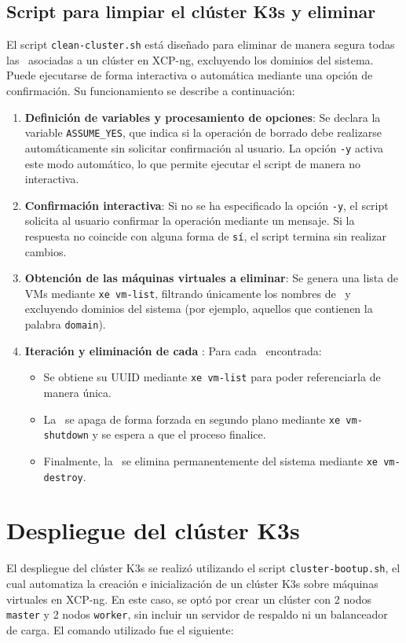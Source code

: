 \subsection{Script para limpiar el clúster K3s y eliminar \VM}
\noindent
El script \texttt{clean-cluster.sh} está diseñado para eliminar de manera segura todas las \VM\ asociadas a un clúster en XCP-ng, excluyendo los dominios del sistema. Puede ejecutarse de forma interactiva o automática mediante una opción de confirmación. Su funcionamiento se describe a continuación:

\begin{enumerate}
    \item \textbf{Definición de variables y procesamiento de opciones}:  
    Se declara la variable \texttt{ASSUME\_YES}, que indica si la operación de borrado debe realizarse automáticamente sin solicitar confirmación al usuario.  
    La opción \texttt{-y} activa este modo automático, lo que permite ejecutar el script de manera no interactiva.

    \item \textbf{Confirmación interactiva}:  
    Si no se ha especificado la opción \texttt{-y}, el script solicita al usuario confirmar la operación mediante un mensaje. Si la respuesta no coincide con alguna forma de \texttt{sí}, el script termina sin realizar cambios.

    \item \textbf{Obtención de las máquinas virtuales a eliminar}:  
    Se genera una lista de VMs mediante \texttt{xe vm-list}, filtrando únicamente los nombres de \VM\ y excluyendo dominios del sistema (por ejemplo, aquellos que contienen la palabra \texttt{domain}).  

    \item \textbf{Iteración y eliminación de cada \VM}:  
    Para cada \VM\ encontrada:
    \begin{itemize}
        \item Se obtiene su UUID mediante \texttt{xe vm-list} para poder referenciarla de manera única.
        \item La \VM\ se apaga de forma forzada en segundo plano mediante \texttt{xe vm-shutdown} y se espera a que el proceso finalice.
        \item Finalmente, la \VM\ se elimina permanentemente del sistema mediante \texttt{xe vm-destroy}.
    \end{itemize}
\end{enumerate}




\section{Despliegue del clúster K3s}\label{sec:despliegue-cluster}
\noindent
El despliegue del clúster K3s se realizó utilizando el script \texttt{cluster-bootup.sh}, el cual automatiza la creación e inicialización de un clúster K3s sobre máquinas virtuales en XCP-ng. En este caso, se optó por crear un clúster con 2 nodos \texttt{master} y 2 nodos \texttt{worker}, sin incluir un servidor de respaldo ni un balanceador de carga. El comando utilizado fue el siguiente:
